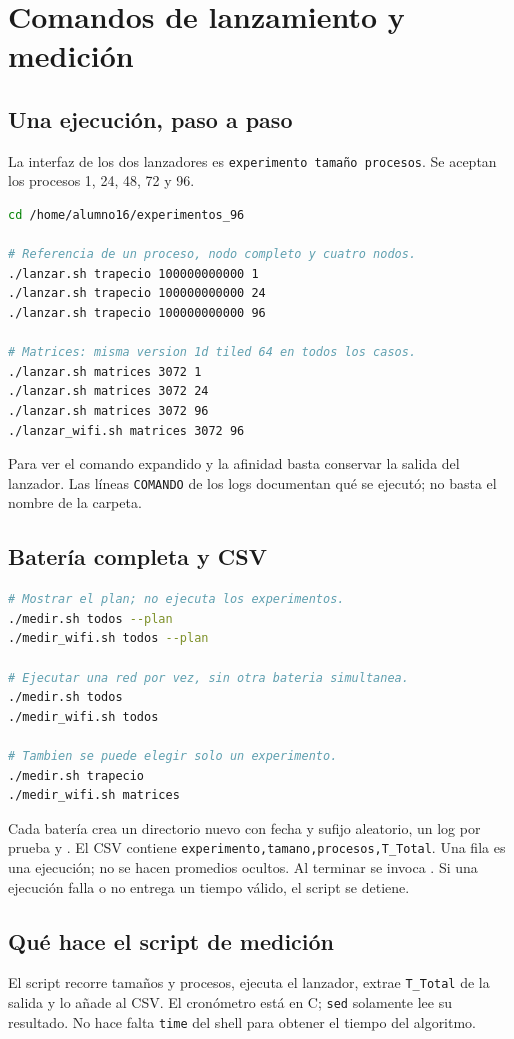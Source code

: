 \section{Comandos de lanzamiento y medición}

\subsection{Una ejecución, paso a paso}
La interfaz de los dos lanzadores es \texttt{experimento tamaño procesos}. Se aceptan los procesos 1, 24, 48, 72 y 96.
\begin{lstlisting}[language=bash]
cd /home/alumno16/experimentos_96

# Referencia de un proceso, nodo completo y cuatro nodos.
./lanzar.sh trapecio 100000000000 1
./lanzar.sh trapecio 100000000000 24
./lanzar.sh trapecio 100000000000 96

# Matrices: misma version 1d tiled 64 en todos los casos.
./lanzar.sh matrices 3072 1
./lanzar.sh matrices 3072 24
./lanzar.sh matrices 3072 96
./lanzar_wifi.sh matrices 3072 96
\end{lstlisting}
Para ver el comando expandido y la afinidad basta conservar la salida del lanzador. Las líneas \texttt{COMANDO} de los logs documentan qué se ejecutó; no basta el nombre de la carpeta.

\subsection{Batería completa y CSV}
\begin{lstlisting}[language=bash]
# Mostrar el plan; no ejecuta los experimentos.
./medir.sh todos --plan
./medir_wifi.sh todos --plan

# Ejecutar una red por vez, sin otra bateria simultanea.
./medir.sh todos
./medir_wifi.sh todos

# Tambien se puede elegir solo un experimento.
./medir.sh trapecio
./medir_wifi.sh matrices
\end{lstlisting}
Cada batería crea un directorio nuevo con fecha y sufijo aleatorio, un log por prueba y . El CSV contiene \texttt{experimento,tamano,procesos,T\_Total}. Una fila es una ejecución; no se hacen promedios ocultos. Al terminar se invoca . Si una ejecución falla o no entrega un tiempo válido, el script se detiene.

\subsection{Qué hace el script de medición}
El script recorre tamaños y procesos, ejecuta el lanzador, extrae \texttt{T\_Total} de la salida y lo añade al CSV. El cronómetro está en C; \texttt{sed} solamente lee su resultado. No hace falta \texttt{time} del shell para obtener el tiempo del algoritmo.

